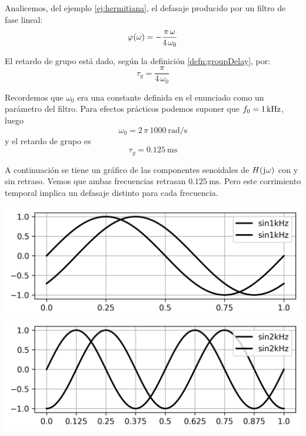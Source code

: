 \begin{mdframed}[style=ExampleFrame]
    \begin{example}
    \end{example}
    Analicemos, del ejemplo \ref{ej:hermitiana}, el defasaje producido por un filtro de fase lineal:
    \[
        \fx[\varphi]{\omega} = - \frac{\pi \, \omega}{4 \, \omega_0}
    \]

    El retardo de grupo está dado, según la definición \ref{defn:groupDelay}, por:
    \[
        \tau_g = \frac{\pi}{4 \, \omega_0}
    \]

    Recordemos que $\omega_0$ era una constante definida en el enunciado como un parámetro del filtro.
    Para efectos prácticos podemos suponer que $f_0 = \kHz$, luego
    \[
        \omega_0 = 2 \, \pi \, \SI{1000}{\radian\per\second}
    \]
    y el retardo de grupo es
    \[
        \tau_g = \SI{0.125}{\milli\second}
    \]

    A continuación se tiene un gráfico de las componentes senoidales de $\fx[H]{\iu \omega}$ con y sin retraso.
    Vemos que ambas frecuencias retrasan $\SI{0.125}{\milli\second}$.
    Pero este corrimiento temporal implica un defasaje distinto para cada frecuencia.

    \begin{center}
        \includegraphics[width=\linewidth]{./images/ej_fase_lineal_1.png}
        \includegraphics[width=\linewidth]{./images/ej_fase_lineal_2.png}
    \end{center}


\end{mdframed}
